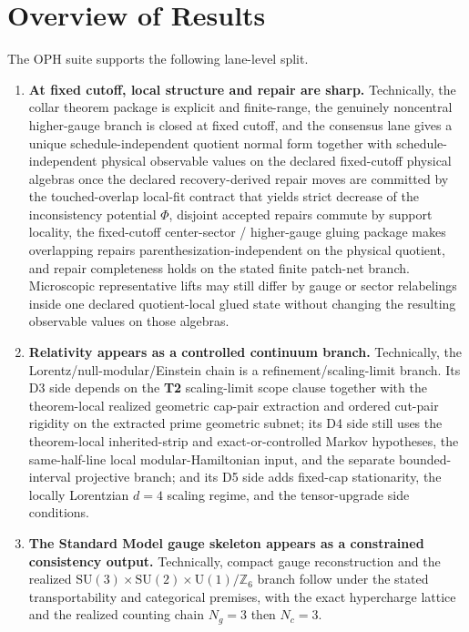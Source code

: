 \documentclass[11pt]{article}
\newcommand{\SU}{\mathrm{SU}}
\newcommand{\U}{\mathrm{U}}
\begin{document}
\section{Overview of Results}

The OPH suite supports the following lane-level split.

\begin{enumerate}[leftmargin=2em]
\item \textbf{At fixed cutoff, local structure and repair are sharp.} Technically, the
collar theorem package is explicit and finite-range, the genuinely noncentral higher-gauge branch
is closed at fixed cutoff, and the consensus lane gives a unique schedule-independent quotient
normal form together with schedule-independent physical observable values on the declared
fixed-cutoff physical algebras once the declared recovery-derived repair moves are committed by the
touched-overlap local-fit contract that yields strict decrease of the inconsistency potential
\(\Phi\), disjoint accepted repairs commute by support locality, the fixed-cutoff center-sector /
higher-gauge gluing package makes overlapping repairs parenthesization-independent on the physical
quotient, and repair completeness holds on the stated finite patch-net branch. Microscopic
representative lifts may still differ by gauge or sector relabelings inside one declared
quotient-local glued state without changing the resulting observable values on those algebras.
\item \textbf{Relativity appears as a controlled continuum branch.}
Technically, the Lorentz/null-modular/Einstein chain is a refinement/scaling-limit branch.
Its D3 side depends on the \textbf{T2} scaling-limit scope clause together with the theorem-local
realized geometric cap-pair extraction and ordered cut-pair rigidity on the extracted prime
geometric subnet; its D4 side still uses the theorem-local inherited-strip and
exact-or-controlled Markov hypotheses, the same-half-line local modular-Hamiltonian input, and
the separate bounded-interval projective branch; and its D5 side adds fixed-cap stationarity,
the locally Lorentzian \(d=4\) scaling regime, and the tensor-upgrade side conditions.
\item \textbf{The Standard Model gauge skeleton appears as a constrained consistency output.}
Technically, compact gauge reconstruction and the realized
\(\SU(3)\times\SU(2)\times\U(1)/\mathbb Z_6\) branch follow under the stated transportability and
categorical premises, with the exact hypercharge lattice and the realized counting chain \(N_g=3\) then \(N_c=3\).

\end{enumerate}
\end{document}
